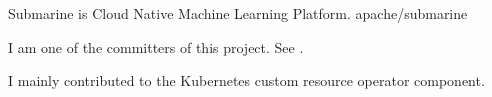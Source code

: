 

\begin{cventries}

  \cventry
  {Submarine is Cloud Native Machine Learning Platform.}
  {apache/submarine \href{https://github.com/apache/submarine}{\color{red}{[Github Link]}}}
  {}
  {} %
  {
    \begin{cvitems} %
      \item {I am one of the committers of this project. See \href{https://people.apache.org/phonebook.html?unix=submarine}{\color{red}{Apache committer index}}.}
      \item {I mainly contributed to the Kubernetes custom resource operator component.}
    \end{cvitems}
  }

\end{cventries}
